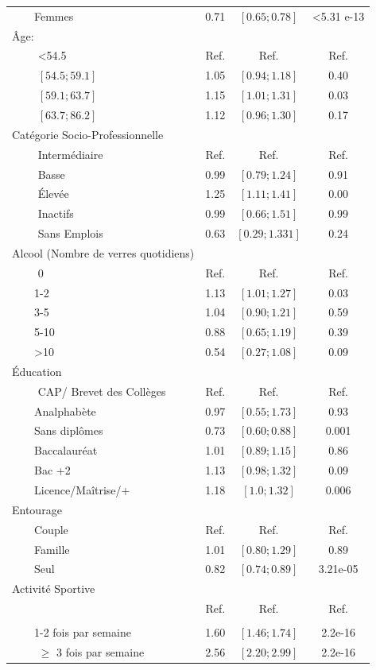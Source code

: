 \documentclass{book}
\begin{document}
\begin{longtable}{lccc}
$\qquad$Femmes & 0.71& $\left[0.65 ; 0.78 \right]$ & <5.31 e-13\\
Âge: &&&\\
$\qquad$ <54.5 &Ref.&Ref.&Ref.\\
$\qquad$ $\left[54.5 ; 59.1 \right]$ &1.05& $\left[0.94 ; 1.18 \right]$& 0.40\\
$\qquad$ $\left[59.1 ; 63.7\right]$ &1.15&$\left[1.01 ; 1.31 \right]$& 0.03\\
$\qquad$ $\left[63.7 ; 86.2 \right]$&1.12&$\left[0.96 ; 1.30 \right]$&0.17\\
Catégorie Socio-Professionnelle&&&\\
$\qquad$ Intermédiaire & Ref. & Ref. & Ref.\\
$\qquad$ Basse & 0.99 & $\left[0.79 ; 1.24 \right]$ &0.91\\
$\qquad$ Élevée & 1.25 & $\left[1.11 ; 1.41 \right]$ &0.00\\
$\qquad$ Inactifs &0.99 &   $\left[0.66 ; 1.51 \right]$ & 0.99\\
$\qquad$ Sans Emplois &0.63 &  $\left[0.29 ; 1.331 \right]$&0.24 \\ 
Alcool (Nombre de verres quotidiens)&&&\\
$\qquad$ 0 &Ref.&Ref.&Ref.\\
$\qquad$1-2 &	1.13	& $\left[1.01 ; 1.27 \right]$	&	0.03\\
$\qquad$3-5&		1.04& $\left[0.90 ; 1.21 \right]$	&	0.59\\
$\qquad$5-10&	0.88& $\left[0.65 ; 1.19 \right]$	&	0.39\\
$\qquad$>10&		0.54& $\left[0.27 ; 1.08 \right]$	&	0.09\\
Éducation&&&\\
$\qquad$ CAP/ Brevet des Collèges &Ref.&Ref.&Ref.\\
$\qquad$Analphabète&0.97&$\left[0.55 ; 1.73 \right]$&0.93\\
$\qquad$Sans diplômes&0.73& $\left[0.60 ; 0.88 \right]$&0.001\\
$\qquad$Baccalauréat&1.01&$\left[0.89 ; 1.15 \right]$&0.86\\
$\qquad$Bac +2&1.13&$\left[0.98 ; 1.32 \right]$&0.09\\
$\qquad$Licence/Maîtrise/+&1.18& $\left[1.0 ; 1.32 \right]$ &0.006\\
Entourage&&&\\
$\qquad$Couple&Ref.&Ref.&Ref.\\
$\qquad$Famille &1.01&$\left[0.80 ; 1.29 \right]$&0.89\\
$\qquad$Seul&0.82& $\left[0.74 ; 0.89 \right]$&3.21e-05\\
Activité Sportive&&&\\
$\qquad$&Ref.&Ref.&Ref.\\\\
$\qquad$1-2 fois par semaine&1.60& $\left[1.46 ; 1.74 \right]$& 2.2e-16\\
$\qquad$ $\geq$ 3 fois par semaine& 2.56& $\left[2.20 ; 2.99 \right]$ & 2.2e-16\\
    \hline
    \end{longtable} 
\end{document}

